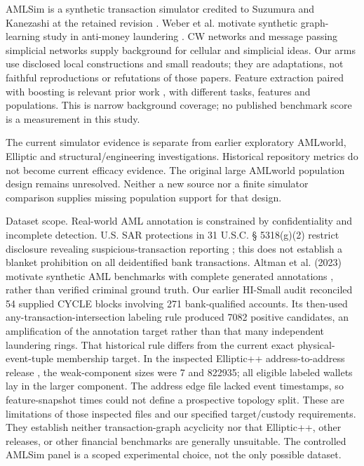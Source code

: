 \documentclass{article}
\begin{document}
AMLSim is a synthetic transaction simulator credited to Suzumura and Kanezashi at the retained revision \citep{AMLSIM}. Weber et al. motivate synthetic graph-learning study in anti-money laundering \citep{WEBER2018}. CW networks \citep{CWN2021} and message passing simplicial networks \citep{MPSN2021} supply background for cellular and simplicial ideas. Our arms use disclosed local constructions and small readouts; they are adaptations, not faithful reproductions or refutations of those papers. Feature extraction paired with boosting is relevant prior work \citep{GFP2024}, with different tasks, features and populations. This is narrow background coverage; no published benchmark score is a measurement in this study.

The current simulator evidence is separate from earlier exploratory AMLworld, Elliptic and structural/engineering investigations. Historical repository metrics do not become current efficacy evidence. The original large AMLworld population design remains unresolved. Neither a new source nor a finite simulator comparison supplies missing population support for that design.

Dataset scope. Real-world AML annotation is constrained by confidentiality and incomplete detection. U.S. SAR protections in 31 U.S.C. \S{} 5318(g)(2) restrict disclosure revealing suspicious-transaction reporting \citep{SAR_CONFIDENTIALITY}; this does not establish a blanket prohibition on all deidentified bank transactions. Altman et al. (2023) motivate synthetic AML benchmarks with complete generated annotations \citep{ALTMAN2023}, rather than verified criminal ground truth. Our earlier HI-Small audit reconciled 54 supplied CYCLE blocks involving 271 bank-qualified accounts. Its then-used any-transaction-intersection labeling rule produced 7082 positive candidates, an amplification of the annotation target rather than that many independent laundering rings. That historical rule differs from the current exact physical-event-tuple membership target. In the inspected Elliptic++ address-to-address release \citep{ELLIPTIC2023}, the weak-component sizes were 7 and 822935; all eligible labeled wallets lay in the larger component. The address edge file lacked event timestamps, so feature-snapshot times could not define a prospective topology split. These are limitations of those inspected files and our specified target/custody requirements. They establish neither transaction-graph acyclicity nor that Elliptic++, other releases, or other financial benchmarks are generally unsuitable. The controlled AMLSim panel is a scoped experimental choice, not the only possible dataset.
\end{document}
